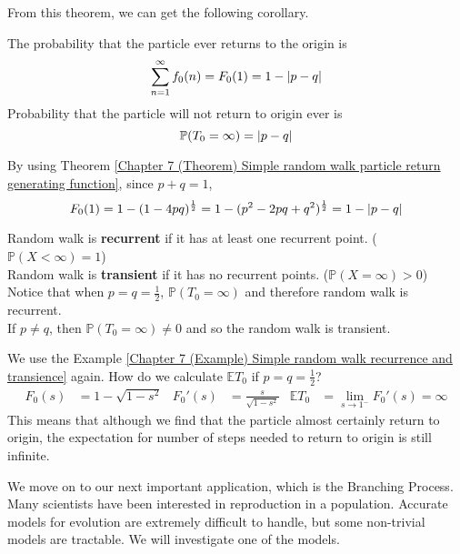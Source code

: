 \documentclass{huhtakm-template-book}
\newcommand{\prob}{\mathbb{P}}
\newcommand{\expect}{\mathbb{E}}
\begin{document}
From this theorem, we can get the following corollary.
\begin{cor}
	The probability that the particle ever returns to the origin is
	\begin{equation*}
		\sum_{n=1}^{\infty}f_{0}(n)=F_{0}(1)=1-\left|{p-q}\right|
	\end{equation*}
	Probability that the particle will not return to origin ever is
	\begin{equation*}
		\prob(T_{0}=\infty)=\abs{p-q}
	\end{equation*}
\end{cor}
\begin{proofing}
	By using Theorem \ref{Chapter 7 (Theorem) Simple random walk particle return generating function}, since $p+q=1$,
	\begin{equation*}
		F_{0}(1)=1-(1-4pq)^{\frac{1}{2}}=1-(p^{2}-2pq+q^{2})^{\frac{1}{2}}=1-\left|{p-q}\right|
	\end{equation*}
\end{proofing}
\begin{rem}
	Random walk is \textbf{recurrent} if it has at least one recurrent point. ($\prob(X<\infty)=1$)\\
	Random walk is \textbf{transient} if it has no recurrent points. ($\prob(X=\infty)>0$)\\
	Notice that when $p=q=\frac{1}{2}$, $\prob(T_{0}=\infty)$ and therefore random walk is recurrent.\\
	If $p\neq q$, then $\prob(T_{0}=\infty)\neq 0$ and so the random walk is transient.
\end{rem}
\begin{eg}
	We use the Example \ref{Chapter 7 (Example) Simple random walk recurrence and transience} again. How do we calculate $\expect T_{0}$ if $p=q=\frac{1}{2}$?
	\begin{align*}
		F_{0}(s)&=1-\sqrt{1-s^{2}} & F_{0}'(s)&=\frac{s}{\sqrt{1-s^{2}}} & \expect T_{0}&=\lim_{s\to 1^{-}}F_{0}'(s)=\infty
	\end{align*}
	This means that although we find that the particle almost certainly return to origin, the expectation for number of steps needed to return to origin is still infinite.
\end{eg}
We move on to our next important application, which is the Branching Process.\\
Many scientists have been interested in reproduction in a population. Accurate models for evolution are extremely difficult to handle, but some non-trivial models are tractable. We will investigate one of the models.
\end{document}
